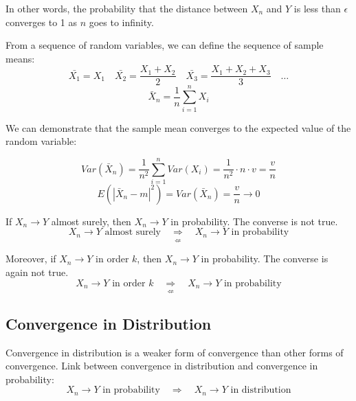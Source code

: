 In other words, the probability that the distance between $X_n$ and $Y$ is less than $\epsilon$ converges to 1 as $n$ goes to infinity.




From a sequence of random variables, we can define the sequence of sample means:
\[
\bar{X_1} = X_1 \quad \bar{X_2} = \frac{X_1 + X_2}{2} \quad \bar{X_3} = \frac{X_1 + X_2 + X_3}{3} \quad \ldots
\]
\[
\bar{X}_n = \frac{1}{n} \sum_{i=1}^{n} X_i
\]

We can demonstrate that the sample mean converges to the expected value of the random variable:

\[
Var(\bar{X}_n) = \frac{1}{n^2} \sum_{i=1}^{n} Var(X_i) = \frac{1}{n^2} \cdot n \cdot v = \frac{v}{n}
\]
\[
E(|\bar{X}_n - m|^2) = Var(\bar{X}_n) = \frac{v}{n} \to 0
\]


If $X_n \to Y$ almost surely, then $X_n \to Y$ in probability. The converse is not true.
\[
X_n \to Y \text{ almost surely} \quad \underset{\nLeftarrow}{\Rightarrow} \quad X_n \to Y \text{ in probability}
\]

Moreover, if $X_n \to Y$ in order $k$, then $X_n \to Y$ in probability. The converse is again not true.
\[
X_n \to Y \text{ in order } k \quad \underset{\nLeftarrow}{\Rightarrow} \quad X_n \to Y \text{ in probability}
\]

\subsection*{Convergence in Distribution}


Convergence in distribution is a weaker form of convergence than other forms of convergence.
Link between convergence in distribution and convergence in probability:
\[
X_n \to Y \text{ in probability} \quad \Rightarrow \quad X_n \to Y \text{ in distribution}
\]

